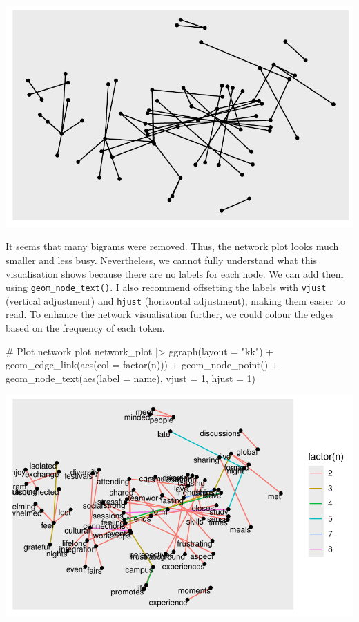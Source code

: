 \documentclass[
  letterpaper,
]{krantz}
\makeatletter
\newenvironment{Shaded}{\begin{snugshade}}{\end{snugshade}}
\newcommand{\AttributeTok}[1]{\textcolor[rgb]{0.40,0.45,0.13}{#1}}
\newcommand{\CommentTok}[1]{\textcolor[rgb]{0.37,0.37,0.37}{#1}}
\newcommand{\DecValTok}[1]{\textcolor[rgb]{0.68,0.00,0.00}{#1}}
\newcommand{\FunctionTok}[1]{\textcolor[rgb]{0.28,0.35,0.67}{#1}}
\newcommand{\NormalTok}[1]{\textcolor[rgb]{0.00,0.23,0.31}{#1}}
\newcommand{\SpecialCharTok}[1]{\textcolor[rgb]{0.37,0.37,0.37}{#1}}
\newcommand{\StringTok}[1]{\textcolor[rgb]{0.13,0.47,0.30}{#1}}
\newenvironment{kframe}{%
\medskip{}
\setlength{\fboxsep}{.8em}
 \def\at@end@of@kframe{}%
 \ifinner\ifhmode%
  \def\at@end@of@kframe{\end{minipage}}%
  \begin{minipage}{\columnwidth}%
 \fi\fi%
 \def\FrameCommand##1{\hskip\@totalleftmargin \hskip-\fboxsep
 \colorbox{shadecolor}{##1}\hskip-\fboxsep
     \hskip-\linewidth \hskip-\@totalleftmargin \hskip\columnwidth}%
 \MakeFramed {\advance\hsize-\width
   \@totalleftmargin\z@ \linewidth\hsize
   \@setminipage}}%
 {\par\unskip\endMakeFramed%
 \at@end@of@kframe}
\renewenvironment{Shaded}{\begin{kframe}}{\end{kframe}}
\makeatother
\begin{document}
\includegraphics{14_mixed_methods_files/figure-pdf/ngrams-network-plot-step-two-1.pdf}

It seems that many bigrams were removed. Thus, the network plot looks
much smaller and less busy. Nevertheless, we cannot fully understand
what this visualisation shows because there are no labels for each node.
We can add them using \texttt{geom\_node\_text()}. I also recommend
offsetting the labels with \texttt{vjust} (vertical adjustment) and
\texttt{hjust} (horizontal adjustment), making them easier to read. To
enhance the network visualisation further, we could colour the edges
based on the frequency of each token.

\begin{Shaded}
\begin{Highlighting}[]
\CommentTok{\# Plot network plot}
\NormalTok{network\_plot }\SpecialCharTok{|\textgreater{}}
  \FunctionTok{ggraph}\NormalTok{(}\AttributeTok{layout =} \StringTok{"kk"}\NormalTok{) }\SpecialCharTok{+}
  \FunctionTok{geom\_edge\_link}\NormalTok{(}\FunctionTok{aes}\NormalTok{(}\AttributeTok{col =} \FunctionTok{factor}\NormalTok{(n))) }\SpecialCharTok{+}
  \FunctionTok{geom\_node\_point}\NormalTok{() }\SpecialCharTok{+}
  \FunctionTok{geom\_node\_text}\NormalTok{(}\FunctionTok{aes}\NormalTok{(}\AttributeTok{label =}\NormalTok{ name),}
                 \AttributeTok{vjust =} \DecValTok{1}\NormalTok{,}
                 \AttributeTok{hjust =} \DecValTok{1}\NormalTok{)}
\end{Highlighting}
\end{Shaded}

\includegraphics{14_mixed_methods_files/figure-pdf/ngrams-network-plot-step-three-1.pdf}
\end{document}
